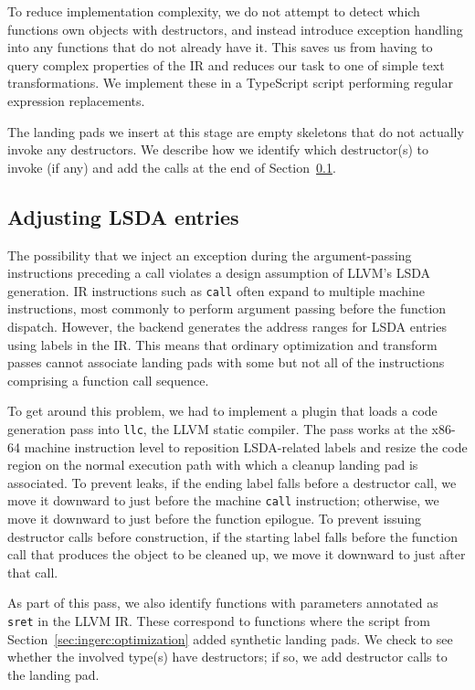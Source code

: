 To reduce implementation complexity, we do not attempt to detect which functions own
objects with destructors, and instead introduce exception handling into any functions
that do not already have it.  This saves us from having to query complex properties
of the IR and reduces our task to one of simple text transformations.  We implement
these in a TypeScript script performing regular expression replacements.

The landing pads we insert at this stage are empty skeletons that do not actually
invoke any destructors.  We describe how we identify which destructor(s) to invoke
(if any) and add the calls at the end of Section~\ref{sec:ingerc:codegen}.


\subsection{Adjusting LSDA entries}
\label{sec:ingerc:codegen}

The possibility that we inject an exception during the argument-passing instructions
preceding a call violates a design assumption of LLVM's LSDA generation.  IR
instructions such as \texttt{call} often expand to multiple machine instructions,
most commonly to perform argument passing before the function dispatch.  However, the
backend generates the address ranges for LSDA entries using labels in the IR.  This
means that ordinary optimization and transform passes cannot associate landing pads
with some but not all of the instructions comprising a function call sequence.

To get around this problem, we had to implement a plugin that loads a code generation
pass into \texttt{llc}, the LLVM static compiler.  The pass works at the x86-64
machine instruction level to reposition LSDA-related labels and resize the code
region
on the normal execution path with which a cleanup landing pad is associated.  To
prevent leaks, if the ending label falls before a destructor call, we move it downward
to just before the machine \texttt{call} instruction; otherwise, we move it downward
to just before the function epilogue.  To prevent issuing destructor calls before
construction, if the starting label falls before the function call that produces the
object to be cleaned up, we move it downward to just after that call.

As part of this pass, we also identify functions with parameters annotated as
\texttt{sret} in the LLVM IR.  These correspond to functions where the script from
Section~\ref{sec:ingerc:optimization} added synthetic landing pads.  We check to see
whether the involved type(s) have destructors; if so, we add destructor calls to the
landing pad.


